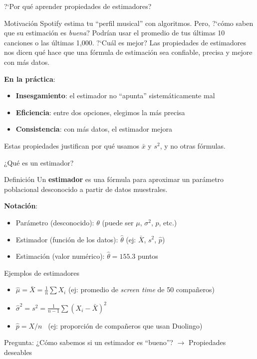 \documentclass[aspectratio=169, 11pt]{beamer}
\begin{document}
\begin{frame}{?`Por qu\'e aprender propiedades de estimadores?}
\begin{exampleblock}{Motivaci\'on}
Spotify estima tu ``perfil musical'' con algoritmos. Pero, ?`c\'omo saben que su estimaci\'on es \emph{buena}? Podr\'ian usar el promedio de tus \'ultimas 10 canciones o las \'ultimas 1{,}000. ?`Cu\'al es mejor? Las propiedades de estimadores nos dicen qu\'e hace que una f\'ormula de estimaci\'on sea confiable, precisa y mejore con m\'as datos.
\end{exampleblock}

\textbf{En la pr\'actica}:
\begin{itemize}\setlength{\itemsep}{1pt}
  \item \textbf{Insesgamiento}: el estimador no ``apunta'' sistem\'aticamente mal
  \item \textbf{Eficiencia}: entre dos opciones, elegimos la m\'as precisa
  \item \textbf{Consistencia}: con m\'as datos, el estimador mejora
\end{itemize}

\alert{Estas propiedades justifican por qu\'e usamos $\bar{x}$ y $s^2$, y no otras f\'ormulas.}
\end{frame}

\begin{frame}{¿Qué es un estimador?}
\begin{block}{Definición}
Un \textbf{estimador} es una fórmula para aproximar un parámetro poblacional desconocido a partir de datos muestrales.
\end{block}

\textbf{Notación}:
\begin{itemize}
\item Parámetro (desconocido): $\theta$ (puede ser $\mu$, $\sigma^2$, $p$, etc.)
\item Estimador (función de los datos): $\hat{\theta}$ (ej: $\bar{X}$, $s^2$, $\hat{p}$)
\item Estimación (valor numérico): $\hat{\theta} = 155.3$ puntos
\end{itemize}

\begin{exampleblock}{Ejemplos de estimadores}
\begin{itemize}
\item $\hat{\mu} = \bar{X} = \frac{1}{n}\sum X_i$ \quad (ej: promedio de \emph{screen time} de 50 compa\~neros)
\item $\hat{\sigma}^2 = s^2 = \frac{1}{n-1}\sum(X_i - \bar{X})^2$
\item $\hat{p} = X/n$ \ (ej: proporci\'on de compa\~neros que usan Duolingo)
\end{itemize}
\end{exampleblock}

\alert{Pregunta}: ¿Cómo sabemos si un estimador es ``bueno''? $\to$ Propiedades deseables
\end{frame}
\end{document}
